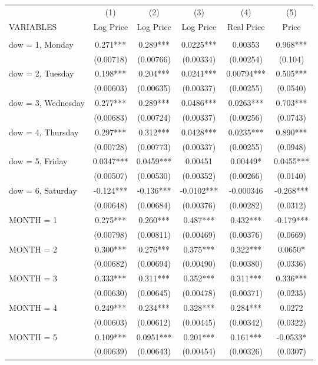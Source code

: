 \begin{tabular}{lccccc} \hline
 & (1) & (2) & (3) & (4) & (5) \\
VARIABLES & Log Price & Log Price & Log Price & Real Price & Price \\ \hline
 &  &  &  &  &  \\
dow = 1, Monday & 0.271*** & 0.289*** & 0.0225*** & 0.00353 & 0.968*** \\
 & (0.00718) & (0.00766) & (0.00334) & (0.00254) & (0.104) \\
dow = 2, Tuesday & 0.198*** & 0.204*** & 0.0241*** & 0.00794*** & 0.505*** \\
 & (0.00603) & (0.00635) & (0.00337) & (0.00255) & (0.0540) \\
dow = 3, Wednesday & 0.277*** & 0.289*** & 0.0486*** & 0.0263*** & 0.703*** \\
 & (0.00683) & (0.00724) & (0.00337) & (0.00256) & (0.0743) \\
dow = 4, Thursday & 0.297*** & 0.312*** & 0.0428*** & 0.0235*** & 0.890*** \\
 & (0.00728) & (0.00773) & (0.00337) & (0.00255) & (0.0948) \\
dow = 5, Friday & 0.0347*** & 0.0459*** & 0.00451 & 0.00449* & 0.0455*** \\
 & (0.00507) & (0.00530) & (0.00352) & (0.00266) & (0.0140) \\
dow = 6, Saturday & -0.124*** & -0.136*** & -0.0102*** & -0.000346 & -0.268*** \\
 & (0.00648) & (0.00684) & (0.00376) & (0.00282) & (0.0312) \\
MONTH = 1 & 0.275*** & 0.260*** & 0.487*** & 0.432*** & -0.179*** \\
 & (0.00798) & (0.00811) & (0.00469) & (0.00376) & (0.0669) \\
MONTH = 2 & 0.300*** & 0.276*** & 0.375*** & 0.322*** & 0.0650* \\
 & (0.00682) & (0.00694) & (0.00490) & (0.00380) & (0.0336) \\
MONTH = 3 & 0.333*** & 0.311*** & 0.352*** & 0.311*** & 0.336*** \\
 & (0.00630) & (0.00645) & (0.00478) & (0.00371) & (0.0235) \\
MONTH = 4 & 0.249*** & 0.234*** & 0.328*** & 0.284*** & 0.0272 \\
 & (0.00603) & (0.00612) & (0.00445) & (0.00342) & (0.0322) \\
MONTH = 5 & 0.109*** & 0.0951*** & 0.201*** & 0.161*** & -0.0533* \\
 & (0.00639) & (0.00643) & (0.00454) & (0.00326) & (0.0307) \\

\end{tabular}
